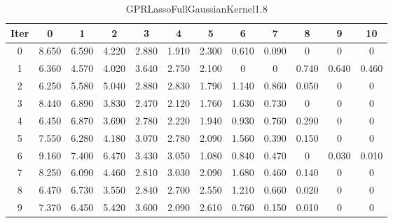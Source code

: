 \begin{table}
	\begin{center}
		\begin{tabular}{|c|c|c|c|c|c|c|c|c|c|c|c|}
			\hline
			Iter & 0 & 1 & 2 & 3 & 4 & 5 & 6 & 7 & 8 & 9 & 10 \\
			\hline
			0 & 8.650 & 6.590 & 4.220 & 2.880 & 1.910 & 2.300 & 0.610 & 0.090 & 0 & 0 & 0 \\
			\hline
			1 & 6.360 & 4.570 & 4.020 & 3.640 & 2.750 & 2.100 & 0 & 0 & 0.740 & 0.640 & 0.460 \\
			\hline
			2 & 6.250 & 5.580 & 5.040 & 2.880 & 2.830 & 1.790 & 1.140 & 0.860 & 0.050 & 0 & 0 \\
			\hline
			3 & 8.440 & 6.890 & 3.830 & 2.470 & 2.120 & 1.760 & 1.630 & 0.730 & 0 & 0 & 0 \\
			\hline
			4 & 6.450 & 6.870 & 3.690 & 2.780 & 2.220 & 1.940 & 0.930 & 0.760 & 0.290 & 0 & 0 \\
			\hline
			5 & 7.550 & 6.280 & 4.180 & 3.070 & 2.780 & 2.090 & 1.560 & 0.390 & 0.150 & 0 & 0 \\
			\hline
			6 & 9.160 & 7.400 & 6.470 & 3.430 & 3.050 & 1.080 & 0.840 & 0.470 & 0 & 0.030 & 0.010 \\
			\hline
			7 & 8.250 & 6.090 & 4.460 & 2.810 & 3.030 & 2.090 & 1.680 & 0.460 & 0.140 & 0 & 0 \\
			\hline
			8 & 6.470 & 6.730 & 3.550 & 2.840 & 2.700 & 2.550 & 1.210 & 0.660 & 0.020 & 0 & 0 \\
			\hline
			9 & 7.370 & 6.450 & 5.420 & 3.600 & 2.090 & 2.610 & 0.760 & 0.150 & 0.010 & 0 & 0 \\
			\hline
		\end{tabular}
	\end{center}
	\caption{GPRLassoFullGaussianKernel1.8}
\end{table}